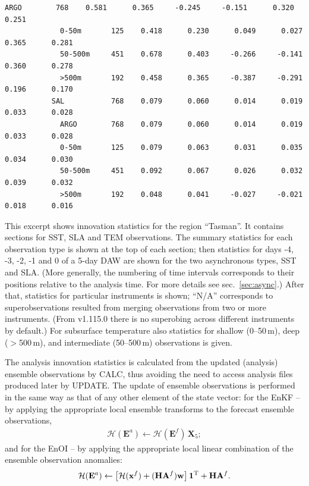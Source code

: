 \documentclass[11pt]{report}
\newcommand{\mb} {\mathbf}
\newcommand{\T}{^{\tiny \mathrm T}}
\begin{document}
\begin{Verbatim}[frame=single,fontsize=\footnotesize]
             ARGO        768    0.581      0.365     -0.245     -0.151      0.320      0.251  
             0-50m       125    0.418      0.230      0.049      0.027      0.365      0.281  
             50-500m     451    0.678      0.403     -0.266     -0.141      0.360      0.278  
             >500m       192    0.458      0.365     -0.387     -0.291      0.196      0.170  
           SAL           768    0.079      0.060      0.014      0.019      0.033      0.028  
             ARGO        768    0.079      0.060      0.014      0.019      0.033      0.028  
             0-50m       125    0.079      0.063      0.031      0.035      0.034      0.030  
             50-500m     451    0.092      0.067      0.026      0.032      0.039      0.032  
             >500m       192    0.048      0.041     -0.027     -0.021      0.018      0.016  
\end{Verbatim}
This excerpt shows innovation statistics for the region ``Tasman''.
It contains sections for SST, SLA and TEM observations.
The summary statistics for each observation type is shown at the top of each section; then statistics for days -4, -3, -2, -1 and 0 of a 5-day DAW are shown for the two asynchronous types, SST and SLA.
(More generally, the numbering of time intervals corresponds to their positions relative to the analysis time.
For more details see sec.~\ref{sec:async}.)
After that, statistics for particular instruments is shown; ``N/A'' corresponds to superobservations resulted from merging observations from two or more instruments.
(From v1.115.0 there is no superobing across different instruments by default.)
For subsurface temperature also statistics for shallow (0--50\,m), deep ($>$500\,m), and intermediate (50--500\,m) observations is given.

The analysis innovation statistics is calculated from the updated (analysis) ensemble observations by CALC, thus avoiding the need to access analysis files produced later by UPDATE.
The update of ensemble observations is performed in the same way as that of any other element of the state vector:
for the EnKF -- by applying the appropriate local ensemble transforms to the forecast ensemble observations,
\begin{align*}
  \mathcal H (\mb E^a) \leftarrow \mathcal H (\mb E^f) \, \mb X_5;
\end{align*}
and for the EnOI -- by applying the appropriate local linear combination of the ensemble observation anomalies:
\begin{align*}
  \mathcal H (\mb E^a) \leftarrow \left[ \mathcal H (\mb x^f) + (\mb H \mb A^f) \mb w\right] \mb 1\T + \mb H \mb A^f.
\end{align*}
\end{document}
